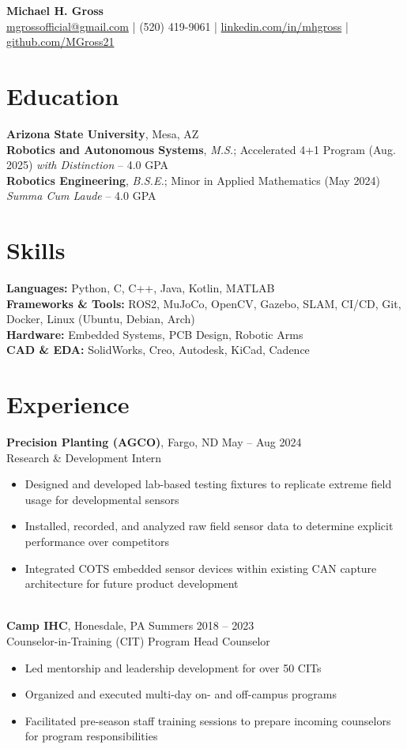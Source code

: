 \documentclass[10pt]{article}
\begin{document}
\begin{center}
    {\LARGE \textbf{Michael H. Gross}} \\
    \href{mailto:mgrossofficial@gmail.com}{mgrossofficial@gmail.com} | (520) 419-9061 | 
    \href{https://www.linkedin.com/in/mhgross}{linkedin.com/in/mhgross} | \href{https://github.com/MGross21}{github.com/MGross21}
\end{center}

\section*{Education}
\textbf{Arizona State University}, Mesa, AZ \\
\textbf{Robotics and Autonomous Systems}, \textit{M.S.}; Accelerated 4+1 Program (Aug. 2025) \hfill \textit{with Distinction} -- 4.0 GPA \\
\textbf{Robotics Engineering}, \textit{B.S.E.}; Minor in Applied Mathematics (May 2024) \hfill \textit{Summa Cum Laude} -- 4.0 GPA

\section*{Skills}
\textbf{Languages:} Python, C, C++, Java, Kotlin, MATLAB \\
\textbf{Frameworks \& Tools:} ROS2, MuJoCo, OpenCV, Gazebo, SLAM, CI/CD, Git, Docker, Linux (Ubuntu, Debian, Arch) \\
\textbf{Hardware:} Embedded Systems, PCB Design, Robotic Arms \\
\textbf{CAD \& EDA:} SolidWorks, Creo, Autodesk, KiCad, Cadence

\section*{Experience}
\textbf{Precision Planting (AGCO)}, Fargo, ND \hfill May -- Aug 2024 \\
Research \& Development Intern
\begin{itemize}
  \item Designed and developed lab-based testing fixtures to replicate extreme field usage for developmental sensors
  \item Installed, recorded, and analyzed raw field sensor data to determine explicit performance over competitors
  \item Integrated COTS embedded sensor devices within existing CAN capture architecture for future product development
\end{itemize}
\\
\textbf{Camp IHC}, Honesdale, PA \hfill Summers 2018 -- 2023 \\
Counselor-in-Training (CIT) Program Head Counselor
\begin{itemize}
  \item Led mentorship and leadership development for over 50 CITs
  \item Organized and executed multi-day on- and off-campus programs
  \item Facilitated pre-season staff training sessions to prepare incoming counselors for program responsibilities
\end{itemize}
\end{document}
